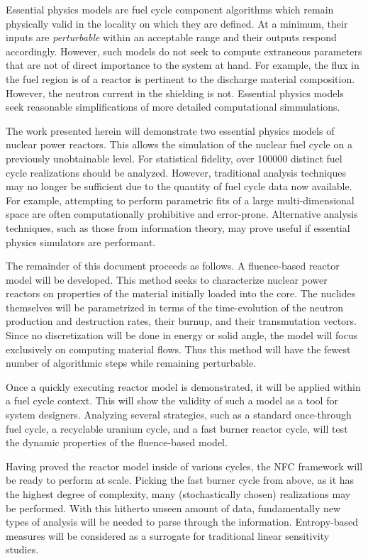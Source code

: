 Essential physics models are fuel cycle component algorithms which remain physically valid in the 
locality on which they are defined.  At a minimum, their inputs are \emph{perturbable} 
within an acceptable range and their outputs respond accordingly.  However, such 
models do not seek to compute extraneous parameters that are not of direct importance
to the system at hand.  For example, the flux in the fuel region is of a reactor is 
pertinent to the discharge material composition.  However, the neutron current in the 
shielding is not. 
Essential physics models seek reasonable simplifications of more detailed computational 
simmulations.

The work presented herein will demonstrate two essential physics models of nuclear power reactors.
This allows the simulation of the nuclear fuel cycle on a previously unobtainable level.
For statistical fidelity, over 100000 distinct fuel cycle realizations should be analyzed.  
However, traditional analysis techniques may no longer be sufficient due to the quantity of fuel cycle data now 
available. For example, attempting to perform parametric fits of a large multi-dimensional 
space are often computationally prohibitive and error-prone.
Alternative analysis techniques, such as those from information theory, may prove useful
if essential physics simulators are performant.

The remainder of this document proceeds as follows.  
A fluence-based reactor model will be developed.  This method seeks to characterize nuclear power
reactors on properties of the material initially loaded into the core.  The nuclides
themselves will be parametrized in terms of the time-evolution of the neutron production 
and destruction rates, their burnup, and their transmutation vectors.  Since no discretization
will be done in energy or solid angle, the model will focus exclusively on computing 
material flows.  Thus this method will have the fewest number of algorithmic steps while 
remaining perturbable. 

Once a quickly executing reactor model is demonstrated, it will be applied within a fuel
cycle context.  This will show the validity of such a model as a tool for system designers.
Analyzing several strategies, such as a standard once-through fuel cycle, a recyclable uranium
cycle, and a fast burner reactor cycle, will test the dynamic properties of the fluence-based
model.  

Having proved the reactor model inside of various cycles, the NFC framework will be ready to 
perform at scale.  Picking the fast burner cycle from above, as it has the highest degree of complexity, 
many (stochastically chosen) realizations may be performed.  With this hitherto unseen amount of data, 
fundamentally new types of analysis will be needed to parse through the information.  Entropy-based measures
will be considered as a surrogate for traditional linear sensitivity studies.

